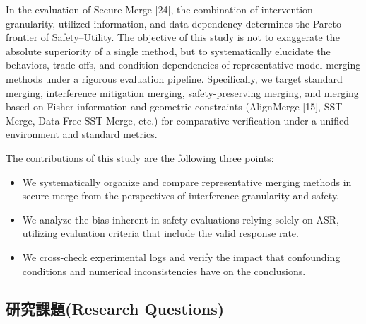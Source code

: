 \documentclass{article}
\begin{document}
In the evaluation of Secure Merge [24], the combination of intervention granularity, utilized information, and data dependency determines the Pareto frontier of Safety--Utility. The objective of this study is not to exaggerate the absolute superiority of a single method, but to systematically elucidate the behaviors, trade-offs, and condition dependencies of representative model merging methods under a rigorous evaluation pipeline. Specifically, we target standard merging, interference mitigation merging, safety-preserving merging, and merging based on Fisher information and geometric constraints (AlignMerge [15], SST-Merge, Data-Free SST-Merge, etc.) for comparative verification under a unified environment and standard metrics.

The contributions of this study are the following three points:

\begin{itemize}
\item We systematically organize and compare representative merging methods in secure merge from the perspectives of interference granularity and safety.
\item We analyze the bias inherent in safety evaluations relying solely on ASR, utilizing evaluation criteria that include the valid response rate.
\item We cross-check experimental logs and verify the impact that confounding conditions and numerical inconsistencies have on the conclusions.
\end{itemize}



\subsection{研究課題(Research Questions)}
\label{gen_inst}

\end{document}

